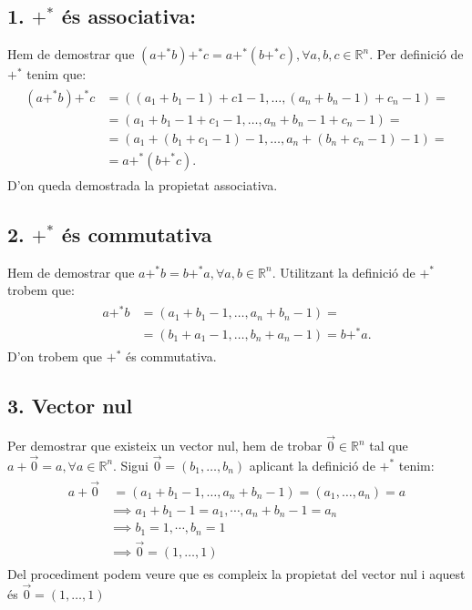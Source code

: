 \documentclass[a4paper, 9pt]{article}
\begin{document}
    \subsection*{1. ${+^*}$ \'es associativa:}
        Hem de demostrar que ${(a+^*b)+^*c = a+^*(b+^*c), \forall a,b,c \in \mathbb{R}^n}$. Per definici\'o de ${+^*}$ tenim que:
        \begin{align*}
            \begin{aligned}
                (a+^*b)+^*c &= ((a_1+b_1-1)+c1-1,\dots,(a_n+b_n-1)+c_n-1) =\\ 
                        &= (a_1+b_1-1+c_1-1,\dots,a_n+b_n-1+c_n-1) =\\ 
                        &= (a_1+(b_1+c_1-1)-1,\dots,a_n+(b_n+c_n-1)-1) =\\
                        &= a+^*(b+^*c).
            \end{aligned}
        \end{align*}
        D'on queda demostrada la propietat associativa.

    \subsection*{2. ${+^*}$ \'es commutativa}
        Hem de demostrar que ${a +^* b = b +^* a, \forall a,b \in \mathbb{R}^n}$. Utilitzant la definici\'o de ${+^*}$ trobem que:
        \begin{align*}
            \begin{aligned}
                a +^* b &= (a_1 + b_1 -1, \dots , a_n+b_n-1) =\\
                        &=(b_1+a_1-1, \dots , b_n+a_n-1) = b +^* a.
            \end{aligned}
        \end{align*}
        D'on trobem que ${+^*}$ \'es commutativa.

    \subsection*{3. Vector nul} 
        Per demostrar que existeix un vector nul, hem de trobar ${\vec{0} \in \mathbb{R}^n}$ tal que ${a + \vec{0} = a, \forall a \in \mathbb{R}^n}$. Sigui ${\vec{0} = (b_1,\dots,b_n)}$ aplicant la definici\'o de ${+^*}$ tenim:
        \begin{align*}
            \begin{aligned}
                a + \vec{0} &\:= (a_1+b_1-1,\dots,a_n+b_n-1) = (a_1,\dots,a_n) = a \\
                            &\implies  a_1+b_1-1 = a_1, \cdots, a_n+b_n-1 = a_n \\
                            &\implies b_1 = 1, \cdots , b_n = 1\\
                            &\implies \vec{0} = (1, \dots, 1)
            \end{aligned}
        \end{align*}
        Del procediment podem veure que es compleix la propietat del vector nul i aquest \'es ${\vec{0} = (1,\dots,1)}$
        
\end{document}
